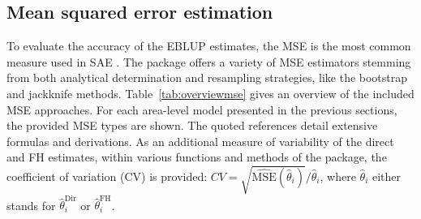 \subsection{Mean squared error estimation} \label{subsec:mseest}
To evaluate the accuracy of the EBLUP estimates, the MSE is the most common
measure used in SAE \citep{Rao2015}. The  package offers a variety of
MSE estimators stemming from both analytical determination and resampling
strategies, like the bootstrap and jackknife methods. Table~\ref{tab:overviewmse} gives
an overview of the included MSE approaches. For each area-level model
presented in the previous sections, the provided MSE
types are shown. The quoted references detail extensive
formulas and derivations. As an additional measure of variability of the direct and
FH estimates, within various functions and methods of the  package, the
coefficient of variation (CV) is provided:
$ CV = \sqrt{\widehat{\text{MSE}}(\hat{\theta}_{i})}/\hat{\theta}_{i}$, where
$\hat{\theta}_{i}$ either stands for $\hat{\theta}_{i}^{\text{Dir}}$ or
$\hat{\theta}_{i}^{\text{FH}}$.
%
